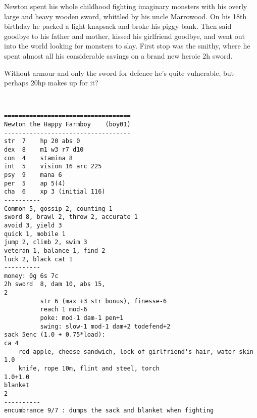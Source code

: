 \clearpage
\begin{samepage}

\noindent Newton spent his whole childhood fighting imaginary monsters with his overly large and heavy wooden sword, whittled by his uncle Marrowood. On his 18th birthday he packed a light knapsack and broke his piggy bank. Then said goodbye to his father and mother, kissed his girlfriend goodbye, and went out into the world looking for monsters to slay. First stop was the smithy, where he spent almost all his considerable savings on a brand new heroic 2h sword.

Without armour and only the sword for defence he's quite vulnerable, but perhaps 20hp makes up for it?

\

\small \begin{verbatim}
===================================
Newton the Happy Farmboy    (boy01)
-----------------------------------
str  7    hp 20 abs 0
dex  8    m1 w3 r7 d10
con  4    stamina 8
int  5    vision 16 arc 225
psy  9    mana 6
per  5    ap 5(4)
cha  6    xp 3 (initial 116)
----------
Common 5, gossip 2, counting 1
sword 8, brawl 2, throw 2, accurate 1
avoid 3, yield 3 
quick 1, mobile 1
jump 2, climb 2, swim 3
veteran 1, balance 1, find 2
luck 2, black cat 1
----------
money: 0g 6s 7c
2h sword  8, dam 10, abs 15,                                                   2
          str 6 (max +3 str bonus), finesse-6
          reach 1 mod-6
          poke: mod-1 dam-1 pen+1
          swing: slow-1 mod-1 dam+2 todefend+2
sack 5enc (1.0 + 0.75*load):                                                ca 4
    red apple, cheese sandwich, lock of girlfriend's hair, water skin    1.0
    knife, rope 10m, flint and steel, torch                          1.0+1.0
blanket                                                                        2
----------
encumbrance 9/7 : dumps the sack and blanket when fighting
\end{verbatim} \end{samepage} \normalsize


























